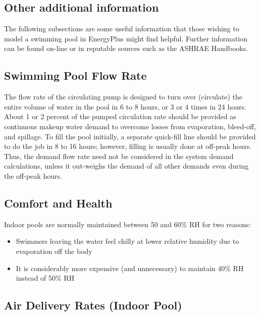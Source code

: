 \subsection{Other additional information}\label{other-additional-information}

The following subsections are some useful information that those wishing to model a swimming pool in EnergyPlus might find helpful. Further information can be found on-line or in reputable sources such as the ASHRAE Handbooks.

\subsection{Swimming Pool Flow Rate}\label{swimming-pool-flow-rate}

The flow rate of the circulating pump is designed to turn over (circulate) the entire volume of water in the pool in 6 to 8 hours, or 3 or 4 times in 24 hours. About 1 or 2 percent of the pumped circulation rate should be provided as continuous makeup water demand to overcome losses from evaporation, bleed-off, and spillage. To fill the pool initially, a separate quick-fill line should be provided to do the job in 8 to 16 hours; however, filling is usually done at off-peak hours. Thus, the demand flow rate need not be considered in the system demand calculations, unless it out-weighs the demand of all other demands even during the off-peak hours.

\subsection{Comfort and Health}\label{comfort-and-health}

Indoor pools are normally maintained between 50 and 60\% RH for two reasons:

\begin{itemize}
\tightlist
\item
  Swimmers leaving the water feel chilly at lower relative humidity due to evaporation off the body
\item
  It is considerably more expensive (and unnecessary) to maintain 40\% RH instead of 50\% RH
\end{itemize}

\subsection{Air Delivery Rates (Indoor Pool)}\label{air-delivery-rates-indoor-pool}

